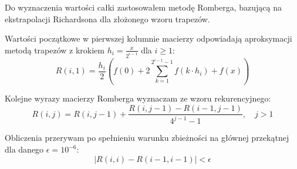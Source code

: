 \documentclass[11pt,a4paper]{article}
\begin{document}
Do wyznaczenia wartości całki zastosowałem metodę Romberga, bazującą na ekstrapolacji Richardsona dla złożonego wzoru trapezów.

Wartości początkowe w pierwszej kolumnie macierzy odpowiadają aproksymacji metodą trapezów z krokiem $h_i = \frac{x}{2^{i-1}}$ dla $i \ge 1$:
$$ R(i,1) = \frac{h_i}{2} \left( f(0) + 2 \sum_{k=1}^{2^{i-1}-1} f(k \cdot h_i) + f(x) \right) $$

Kolejne wyrazy macierzy Romberga wyznaczam ze wzoru rekurencyjnego:
$$ R(i,j) = R(i,j-1) + \frac{R(i,j-1) - R(i-1,j-1)}{4^{j-1} - 1}, \quad j > 1 $$

Obliczenia przerywam po spełnieniu warunku zbieżności na głównej przekątnej dla danego $\epsilon = 10^{-6}$:
$$ |R(i,i) - R(i-1,i-1)| < \epsilon $$
\end{document}
